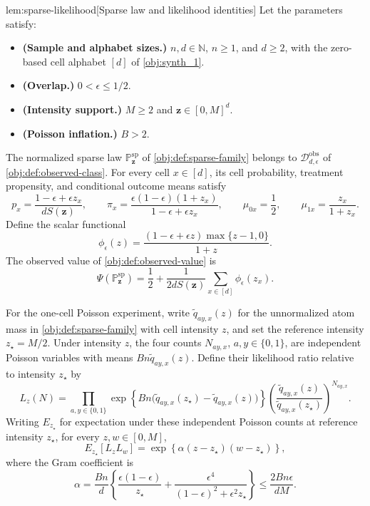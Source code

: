 \begin{lemmav}{lem:sparse-likelihood}[Sparse law and likelihood identities]
Let the parameters satisfy:
\begin{itemize}
\item \textbf{(Sample and alphabet sizes.)} \(n,d\in\mathbb N\), \(n\ge1\), and \(d\ge2\), with the zero-based cell alphabet \([d]\) of \cref{obj:synth_1}.
\item \textbf{(Overlap.)} \(0<\epsilon\le1/2\).
\item \textbf{(Intensity support.)} \(M\ge2\) and \(\mathbf z\in[0,M]^d\).
\item \textbf{(Poisson inflation.)} \(B>2\).
\end{itemize}
The normalized sparse law \(\mathbb P_{\mathbf z}^{\mathrm{sp}}\) of \cref{obj:def:sparse-family} belongs to \(\mathcal D_{d,\epsilon}^{\mathrm{obs}}\) of \cref{obj:def:observed-class}. For every cell \(x\in[d]\), its cell probability, treatment propensity, and conditional outcome means satisfy
\[
p_x=\frac{1-\epsilon+\epsilon z_x}{dS(\mathbf z)},
\qquad
\pi_x=\frac{\epsilon(1-\epsilon)(1+z_x)}
{1-\epsilon+\epsilon z_x},
\qquad
\mu_{0x}=\frac12,
\qquad
\mu_{1x}=\frac{z_x}{1+z_x}.
\]
Define the scalar functional
\[
\phi_\epsilon(z)
=\frac{(1-\epsilon+\epsilon z)\max\{z-1,0\}}{1+z}.
\]
The observed value of \cref{obj:def:observed-value} is
\[
\Psi(\mathbb P_{\mathbf z}^{\mathrm{sp}})
=\frac12+\frac{1}{2dS(\mathbf z)}
\sum_{x\in[d]}\phi_\epsilon(z_x).
\]

For the one-cell Poisson experiment, write
\(\widetilde q_{ay,x}(z)\) for the unnormalized atom mass in
\cref{obj:def:sparse-family} with cell intensity \(z\), and set the reference intensity \(z_\star=M/2\). Under intensity \(z\), the four counts \(N_{ay,x}\), \(a,y\in\{0,1\}\), are independent Poisson variables with means \(Bn\widetilde q_{ay,x}(z)\). Define their likelihood ratio relative to intensity \(z_\star\) by
\[
L_z(N)
=
\prod_{a,y\in\{0,1\}}
\exp\!\left\{
Bn\bigl(\widetilde q_{ay,x}(z_\star)
-\widetilde q_{ay,x}(z)\bigr)
\right\}
\left(
\frac{\widetilde q_{ay,x}(z)}
{\widetilde q_{ay,x}(z_\star)}
\right)^{N_{ay,x}}.
\]
Writing \(E_{z_\star}\) for expectation under these independent Poisson counts at reference intensity \(z_\star\), for every \(z,w\in[0,M]\),
\[
E_{z_\star}[L_zL_w]
=\exp\!\left\{\alpha(z-z_\star)(w-z_\star)\right\},
\]
where the Gram coefficient is
\[
\alpha
=\frac{Bn}{d}
\left\{
\frac{\epsilon(1-\epsilon)}{z_\star}
+\frac{\epsilon^4}{(1-\epsilon)^2+\epsilon^2z_\star}
\right\}
\le \frac{2Bn\epsilon}{dM}.
\]
\end{lemmav}

